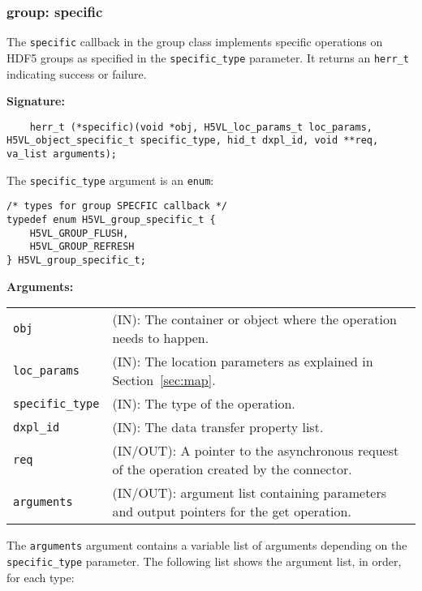 \subsubsection{group: specific}
The \texttt{specific} callback in the group class implements specific operations on HDF5 groups as specified in the \texttt{specific\_type} parameter. It returns an \texttt{herr\_t} indicating success or failure.\bigskip

\begin{mdframed}[style=bgbox]
\textbf{Signature:}
\begin{lstlisting}
	herr_t (*specific)(void *obj, H5VL_loc_params_t loc_params, H5VL_object_specific_t specific_type, hid_t dxpl_id, void **req, va_list arguments);
\end{lstlisting}

The \texttt{specific\_type} argument is an \texttt{enum}:
\begin{lstlisting}
/* types for group SPECFIC callback */                                           
typedef enum H5VL_group_specific_t {                                             
    H5VL_GROUP_FLUSH,                                                            
    H5VL_GROUP_REFRESH                                                           
} H5VL_group_specific_t;
\end{lstlisting}

\textbf{Arguments:}\\
\begin{tabular}{l p{13.5cm}}
  \texttt{obj} & (IN): The container or object where the operation needs to happen.\\
  \texttt{loc\_params} & (IN): The location parameters as explained in Section~\ref{sec:map}.\\
  \texttt{specific\_type} & (IN): The type of the operation.\\
  \texttt{dxpl\_id} & (IN): The data transfer property list.\\
  \texttt{req} & (IN/OUT): A pointer to the asynchronous request of the
  operation created by the connector.\\
  \texttt{arguments} & (IN/OUT): argument list containing parameters and
  output pointers for the get operation. \\
\end{tabular}
\end{mdframed}

The \texttt{arguments} argument contains a variable list of arguments
depending on the \texttt{specific\_type} parameter. The following list shows
the argument list, in order, for each type:

